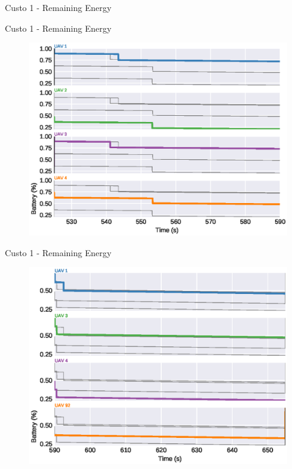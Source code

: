 \begin{frame}{Custo 1 - Remaining Energy}
\begin{figure}[!htb]
                    \end{figure}
                \end{frame}\begin{frame}{Custo 1 - Remaining Energy}
                    \begin{figure}[!htb]
                        \includegraphics[width=\textwidth]{custo_1/uav_remaining_energy_590.eps}
                    \end{figure}
                \end{frame}\begin{frame}{Custo 1 - Remaining Energy}
                    \begin{figure}[!htb]
                        \includegraphics[width=\textwidth]{custo_1/uav_remaining_energy_655.eps}

\end{figure}
\end{frame}
